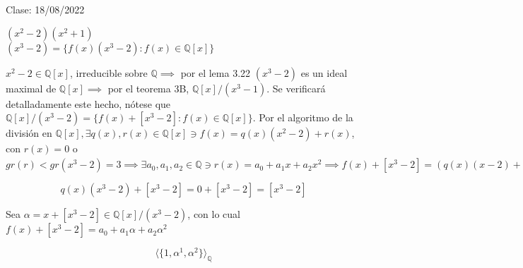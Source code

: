 Clase: 18/08/2022

\begin{cajita}
    $(x^2-2)(x^2+1)$\\
    $\left(x^3-2\right)=\{f(x)(x^3-2):f(x)\in \mathbb{Q}[x]\}$
\end{cajita}

\begin{ejemplo}
    $x^2-2\in\mathbb{Q}[x]$, irreducible sobre $\mathbb{Q}\implies$ por el lema 3.22 $(x^3-2)$ es un ideal maximal de $\mathbb{Q}[x]\implies$ por el teorema 3B, $\mathbb{Q}[x]/(x^3-1)$. Se verificará detalladamente este hecho, nótese que $\mathbb{Q}[x]/(x^3-2)=\{f(x)+[x^3-2]: f(x)\in \mathbb{Q}[x]\}$. Por el algoritmo de la división en $\mathbb{Q}[x],\exists q(x),r(x)\in \mathbb{Q}[x]\ni f(x)=q(x)(x^2-2)+r(x)$, con $r(x)=0$ o $gr(r)<gr(x^3-2)=3\implies \exists a_0,a_1,a_2\in\mathbb{Q}\ni r(x)=a_0+a_1x+a_2x^2\implies f(x)+[x^3-2]=(q(x)(x-2)+r(x))+[x^3-2]= q(x)(x^3-2)+[x^3-2]+r(x)+[x^3-2]=(x^3-2)+r(x)+[x^3-2]=r(x)+[x^3-2] = (a_0 +a_1x+a_2x^2)+(x^3-2)=[a_0+[x^3-2]]+[a_1 x+ [x^3-2]]+[a_2x^2+[x^3-2]] = a_0[x+[x^3-2]]^0 + a_1[x+[x^3-2]]^1+a_2[x+[x^3-2]]^2$
    \begin{cajita}
        $$q(x)(x^3-2)+[x^3-2]=0+[x^3-2]=[x^3-2]$$
    \end{cajita}

    Sea $\alpha = x+[x^3-2]\in \mathbb{Q}[x]/(x^3-2)$, con lo cual $f(x)+[x^3-2]=a_0+a_1\alpha +a_2\alpha^2$

    \begin{cajita}
        $$\langle\{1,\alpha^1,\alpha^2\} \rangle_{\mathbb{Q}}$$
    \end{cajita}


\end{ejemplo}
